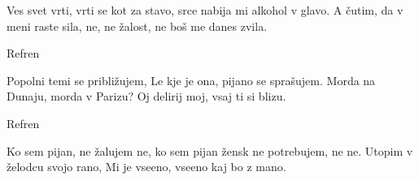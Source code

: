     \beginverse\baselineskip=15pt
        Ves svet vrti, vrti se kot za stavo,
        srce nabija mi alkohol v glavo.
        A čutim, da v meni raste sila,
        ne, ne žalost, ne boš me danes zvila.
    \endverse

    \beginchorus\baselineskip=14pt
        Refren
    \endchorus

    \beginverse\baselineskip=15pt
        Popolni temi se približujem,
        Le kje je ona, pijano se sprašujem.
        Morda na Dunaju, morda v Parizu?
        Oj delirij moj, vsaj ti si blizu.
    \endverse

    \beginchorus\baselineskip=14pt
        Refren 
    \endchorus

    \beginverse\baselineskip=15pt
        Ko sem pijan, ne žalujem
        ne, ko sem pijan žensk ne potrebujem, ne ne.
        Utopim v želodcu svojo rano,
        Mi je vseeno, vseeno kaj bo z mano.
\]\]\]\]\]\]\]\]\]\]\]\]\]\]\]\]\]\]\]\]\]\]\]\]\]\]\]\]\]\]\]\]\]\]\]\]\]\]\]\]\]\]\]\]\]\]\]\]\]\]\]\]\]\]\]\]\]\]\]\]\]\]\]\]\]\]\]\]\]\]\]\]\]\]\]\]\]\]\]\]\]\]\]\]\]\]\]\]\]\]\]\]\]\]\]\]\]\]\]\]\]\]\]\]\]\]\]\]\]\]\]\]\]\]\]\]\]\]\]\]\]\]\]\]\]\]\]\]\]\]\]\]\]\]\]\]\]\]\]\]\]\]\]\]\]\]\]\]\]\]\]\]\]\]\]\]\]\]\]\]\]\]\]\]\]\]\]\]\]\]\]\]\]\]\]\]\]\]\]\]\]\]\]\]\]\]\]\]\]\]\]\]\]\]\]\]\]\]\]\]\]\]\]\]\]\]\]\]\]\]\]\]\]\]\]\]\]\]\]\]\]\]\]\]\]\]\]\]\]\]\]\]\]\]\]\]\]\]\]\]\]\]\]\]\]\]\]\]\]\]\]\]\]\]\]\]\]\]\]\]\]\]\]\]\]\]\]\]\]\]\]\]\]\]\]\]\]\]\]\]\]\]\]\]\]\]\]\]\]\]\]\]\]\]\]\]\]\]\]\]\]\]\]\]\]\]\]\]\]\]\]\]\]\]\]\]\]\]\]\]\]\]\]\]\]\]\]\]\]\]\]\]\]\]\]\]\]\]\]\]\]\]\]\]\]\]\]\]\]\]\]\]\]\]\]\]\]\]\]\]\]\]\]\]\]\]\]\]\]\]\]\]\]\]\]\]\]\]\]\]\]\]\]\]\]\]\]\]\]\]\]\]\]\]\]\]\]\]\]\]\]\]\]\]\]\]\]\]\]\]\]\]\]\]\]\]\]\]\]\]\]\]\]\]\]\]\]\]\]\]\]\]\]\]\]\]\]\]\]\]\]\]\]\]\]\]\]\]\]\]\]\]\]\]\]\]\]\]\]\]\]\]\]\]\]\]\]\]\]\]\]\]\]\]\]\]\]\]\]\]\]\]\]\]\]\]\]\]\]\]\]\]\]\]\]\]\]\]\]\]\]\]\]\]\]\]\]\]\]\]\]\]\]\]\]\]\]\]\]\]\]\]\]\]\]\]\]\]\]\]\]\]\]\]\]\]\]\]\]\]\]\]\]\]\]\]\]\]\]\]\]\]\]\]\]\]\]\]\]\]\]\]\]\]\]\]\]\]\]\]\]\]\]\]\]\]\]\]\]\]\]\]\]\]\]\]\]\]\]\]\]\]\]\]\]\]\]\]\]\]\]\]\]\]\]\]\]\]\]\]\]\]\]\]\]\]\]\]\]\]\]\]\]\]\]\]\]\]\]\]\]\]\]\]\]\]\]\]\]\]\]\]\]\]\]\]\]\]\]\]\]\]\]\]\]\]\]\]\]\]\]\]\]\]\]\]\]\]\]\]\]\]\]\]\]\]\]\]\]\]\]\]\]\]\]\]\]\]\]\]\]\]\]\]\]\]\]\]\]\]\]\]\]\]\]\]\]\]\]\]\]\]\]\]\]\]\]\]\]\]\]\]\]\]\]\]\]\]\]\]\]\]\]\]\]\]\]\]\]\]\]\]\]\]\]\]\]\]\]\]\]\]\]\]\]\]\]\]\]\]\]\]\]\]\]\]\]\]\]\]\]\]\]\]\]\]\]\]\]\]\]\]\]\]\]\]\]\]\]\]\]\]\]\]\]\]\]\]\]\]\]\]\]\]\]\]\]\]\]\]\]\]\]\]\]\]\]\]\]\]\]\]\]\]\]\]\]\]\]\]\]\]\]\]\]\]\]\]\]\]\]\]\]\]\]\]\]\]\]\]\]\]\]\]\]\]\]\]\]\]\]\]\]\]\]\]\]\]\]\]\]\]\]\]\]\]\]\]\]\]\]\]\]\]\]\]\]\]\]\]\]\]\]\]\]\]\]\]\]\]\]\]\]\]\]\]\]\]\]\]\]\]\]\]\]\]\]\]\]\]\]\]\]\]\]\]\]\]\]\]\]\]\]\]\]\]\]\]\]\]\]\]\]\]\]\]\]\]\]\]\]\]\]\]\]\]\]\]\]\]\]\]\]\]\]\]\]\]\]\]\]\]\]\]\]\]\]\]\]\]\]\]\]\]\]\]\]\]\]\]\]\]\]\]\]\]\]\]\]\]\]\]\]\]\]\]\]\]\]\]\]\]\]\]\]\]\]\]\]\]\]\]\]\]\]\]\]\]\]\]\]\]\]\]\]\]\]\]\]\]\]\]\]\]\]\]\]\]\]\]\]\]\]\]\]\]\]\]\]\]\]\]\]\]\]\]\]\]\]\]\]\]\]\]\]\]\]\]\]\]\]\]\]\]\]\]\]\]\]\]\]\]\]\]\]\]\]\]\]\]\]\]\]\]\]\]\]\]\]\]\]\]\]\]\]\]\]\]\]\]\]\]\]\]\]\]\]\]\]\]\]\]\]\]\]\]\]\]\]\]\]\]\]\]\]\]\]\]\]\]\]\]\]\]\]\]\]\]\]\]\]\]\]\]\]\]\]\]\]\]\]\]\]\]\]\]\]\]\]\]\]\]\]\]\]\]\]\]\]\]\]\]\]\]\]\]\]\]\]\]\]\]\]\]\]\]\]\]\]\]\]\]\]\]\]\]\]\]\]\]\]\]
